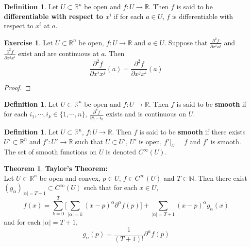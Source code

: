\documentclass{book}
\theoremstyle{definition}
\newtheorem{defn}[definition]{Definition}
\newtheorem{thm}[definition]{Theorem}
\newtheorem{ex}[definition]{Exercise}
\newcommand{\al}{\alpha}
\newcommand{\N}{\mathbb{N}}
\newcommand{\R}{\mathbb{R}}
\newcommand{\lex}[1]{\label{ex:#1}}
\newcommand{\ld}[1]{\label{defn:#1}}
\DeclareMathOperator*{\0}{\mbf{0}}
\DeclareMathOperator*{\1}{\mbf{1}}
\newcommand{\p}{\partial}
\begin{document}
	\begin{defn} \ld{21003}
		Let $U \subset \R^n$ be open and $f: U \rightarrow \R$. Then $f$ is said to be \textbf{differentiable with respect to $x^i$} if for each $a \in U$, $f$ is differentiable with respect to $x^i$ at $a$.
	\end{defn}

	\begin{ex}\lex{21004}
		Let $U \subset \R^n$ be open, $f: U \rightarrow \R$ and $a \in U$. Suppose that $\frac{\partial ^2 f}{\partial x^i x^j}$ and $\frac{\partial ^2 f}{\partial x^j x^i}$ exist and are continuous at $a$. Then $$\frac{\partial ^2 f}{\partial x^i x^j} (a) = \frac{\partial ^2 f}{\partial x^j x^i} (a)$$
	\end{ex}

	\begin{proof}
		
	\end{proof}

	\begin{defn} \ld{21004}
		Let $U \subset \R^n$ be open and $f: U \rightarrow \R$. Then $f$ is said to be \textbf{smooth} if for each $i_1, \cdots, i_k \in \{1, \cdots, n\}$, $\frac{\partial^k f}{\partial i_1 \cdots i_k}$ exists and is continuous on $U$.
	\end{defn}

	\begin{defn} \ld{21005}
		Let $U \subset \R^n$, $f: U \rightarrow \R$. Then $f$ is said to be \textbf{smooth} if there exists $U' 
		\subset \R^n$ and $f':U' \rightarrow \R$ such that $U \subset U'$, $U'$ is open, $f'|_U = f$ and $f'$ is smooth. The set of smooth functions on $U$ is denoted $C^{\infty}(U)$.
	\end{defn}


	\begin{thm} \textbf{Taylor's Theorem:}\\ 
		Let $U \subset \R^n$ be open and convex, $p \in U$, $f \in C^{\infty}(U)$ and $T \in \N$. Then there exist $(g_{\al})_{|\al| = T+1} \subset C^{\infty}(U)$ such that for each $x \in U$, 
		$$f(x) = \sum_{k=0}^{T} \bigg[\sum_{|\al| = k}(x - p)^{\al} \p^{\al} f (p) \bigg] + \sum_{|\al| = T+1}(x - p)^{\al} g_{\al}(x)$$ and for each $|\al|= T+1$, $$g_{\al}(p) = \frac{1}{(T+1)!}\p^{\al} f(p)$$
	\end{thm}
	
\end{document}
